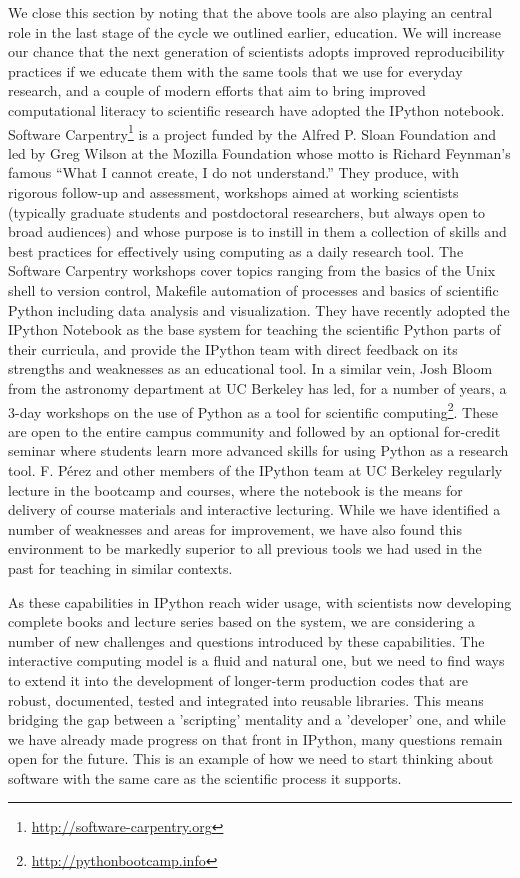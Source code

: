 \documentclass[ChapterTOCs,krantz2]{krantz} %
\begin{document}
We close this section by noting that the above tools are also playing an
central role in the last stage of the cycle we outlined earlier, education.  We
will increase our chance that the next generation of scientists adopts improved
reproducibility practices if we educate them with the same tools that we use
for everyday research, and a couple of modern efforts that aim to bring
improved computational literacy to scientific research have adopted the IPython
notebook.  Software Carpentry\footnote{\url{http://software-carpentry.org}} is
a project funded by the Alfred P. Sloan Foundation and led by Greg Wilson at
the Mozilla Foundation whose motto is Richard Feynman's famous ``What I cannot
create, I do not understand.''  They produce, with rigorous follow-up and
assessment, workshops aimed at working scientists (typically graduate students
and postdoctoral researchers, but always open to broad audiences) and whose
purpose is to instill in them a collection of skills and best practices for
effectively using computing as a daily research tool.  The Software Carpentry
workshops cover topics ranging from the basics of the Unix shell to version
control, Makefile automation of processes and basics of scientific Python
including data analysis and visualization.  They have recently adopted the
IPython Notebook as the base system for teaching the scientific Python parts of
their curricula, and provide the IPython team with direct feedback on its
strengths and weaknesses as an educational tool.  In a similar vein, Josh Bloom
from the astronomy department at UC Berkeley has led, for a number of years, a
3-day workshops on the use of Python as a tool for scientific
computing\footnote{\url{http://pythonbootcamp.info}}.  These are open to the
entire campus community and followed by an optional for-credit seminar where
students learn more advanced skills for using Python as a research tool.  F.
Pérez and other members of the IPython team at UC Berkeley regularly lecture in
the bootcamp and courses, where the notebook is the means for delivery of
course materials and interactive lecturing.  While we have identified a number
of weaknesses and areas for improvement, we have also found this environment to
be markedly superior to all previous tools we had used in the past for teaching
in similar contexts.

As these capabilities in IPython reach wider usage, with scientists now
developing complete books and lecture series based on the system, we are
considering a number of new challenges and questions introduced by these
capabilities.  The interactive computing model is a fluid and natural one, but
we need to find ways to extend it into the development of longer-term
production codes that are robust, documented, tested and integrated into
reusable libraries.  This means bridging the gap between a 'scripting'
mentality and a 'developer' one, and while we have already made progress on
that front in IPython, many questions remain open for the future.  This is an
example of how we need to start thinking about software with the same care as
the scientific process it supports.
\end{document}
